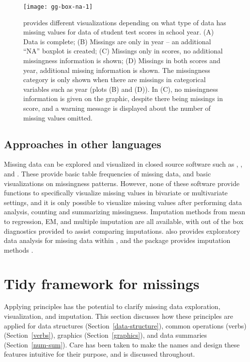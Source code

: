 \documentclass[article]{jss}
\begin{document}
\begin{figure}[t!]
\centering
\texttt{[image: gg-box-na-1]}
%
\caption[ provides different visualizations depending on what
type of data has missing values for data of student test scores in school
year]{ provides different visualizations depending on what type
of data has missing values for data of student test scores in school year.
(A) Data is complete; (B) Missings are only in year -- an additional ``NA''
boxplot is created; (C) Missings only in scores, no additional missingness
information is shown; (D) Missings in both scores and year, additional
missing information is shown.  The missingness category is only shown when
there are missings in categorical variables such as year (plots (B) and
(D)).  In (C), no missingness information is given on the graphic, despite
there being missings in score, and a warning message is displayed about the
number of missing values omitted.}\label{fig:gg-box-na}
%
\end{figure}

\hypertarget{approaches-in-other-languages}{%
\subsection{Approaches in other languages}\label{approaches-in-other-languages}}

Missing data can be explored and visualized in closed source software such
as , , and .  These provide
basic table frequencies of missing data, and basic visualizations on
missingness patterns.  However, none of these software provide functions to
specifically visualize missing values in bivariate or multivariate settings,
and it is only possible to visualize missing values after performing data
analysis, counting and summarizing missingness.  Imputation methods from
mean to regression, EM, and multiple imputation are all available, with out
of the box diagnostics provided to assist comparing imputations.
 also provides exploratory data analysis for missing data
within  \citep{Bilogur2018}, and the 
package provides imputation methods \citep{scikit-learn}.

\hypertarget{extensions}{%
\section{Tidy framework for missings}\label{extensions}}

Applying  principles has the potential to clarify missing
data exploration, visualization, and imputation.  This section discusses how
these principles are applied for data structures (Section~\ref{data-structure}),
common operations (verbs) (Section~\ref{verbs}), graphics (Section~\ref{graphics}), and data
summaries (Section~\ref{num-sum}).  Care has been taken to make the names and design
these features intuitive for their purpose, and is discussed throughout.
\end{document}
